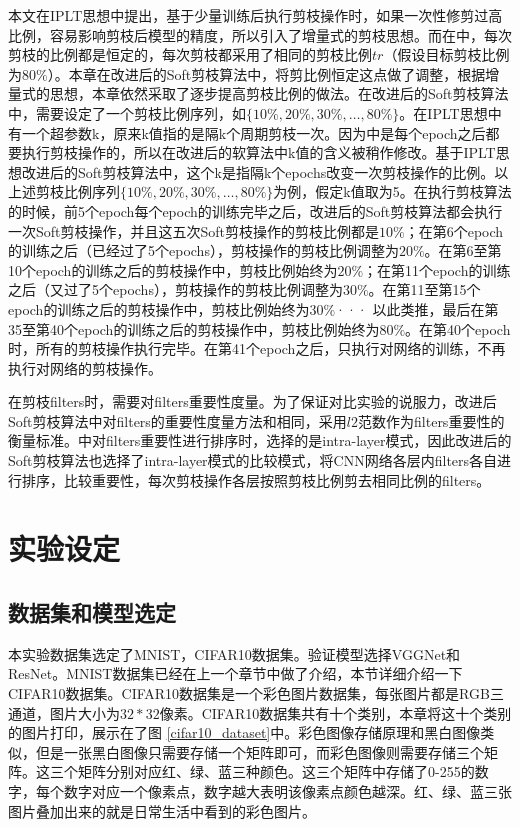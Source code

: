 \documentclass[ pdftex, oneside, master]{NJUthesis}
\begin{document}
本文在IPLT思想中提出，基于少量训练后执行剪枝操作时，如果一次性修剪过高比例，容易影响剪枝后模型的精度，所以引入了增量式的剪枝思想。而在\cite{27}中，每次剪枝的比例都是恒定的，每次剪枝都采用了相同的剪枝比例$tr$（假设目标剪枝比例为$80\%$）。本章在改进后的Soft剪枝算法中，将剪比例恒定这点做了调整，根据增量式的思想，本章依然采取了逐步提高剪枝比例的做法。在改进后的Soft剪枝算法中，需要设定了一个剪枝比例序列，如$\{10\%, 20\%, 30\%, \dots, 80\%\}$。在IPLT思想中有一个超参数k，原来k值指的是隔k个周期剪枝一次。因为\cite{27}中是每个epoch之后都要执行剪枝操作的，所以在改进后的软算法中k值的含义被稍作修改。基于IPLT思想改进后的Soft剪枝算法中，这个k是指隔k个epochs改变一次剪枝操作的比例。以上述剪枝比例序列$\{10\%, 20\%, 30\%, \dots, 80\%\}$为例，假定k值取为5。在执行剪枝算法的时候，前5个epoch每个epoch的训练完毕之后，改进后的Soft剪枝算法都会执行一次Soft剪枝操作，并且这五次Soft剪枝操作的剪枝比例都是$10\%$；在第6个epoch的训练之后（已经过了5个epochs），剪枝操作的剪枝比例调整为$20\%$。在第6至第10个epoch的训练之后的剪枝操作中，剪枝比例始终为$20\%$；在第11个epoch的训练之后（又过了5个epochs），剪枝操作的剪枝比例调整为$30\%$。在第11至第15个epoch的训练之后的剪枝操作中，剪枝比例始终为$30\%$··· 以此类推，最后在第35至第40个epoch的训练之后的剪枝操作中，剪枝比例始终为$80\%$。在第40个epoch时，所有的剪枝操作执行完毕。在第41个epoch之后，只执行对网络的训练，不再执行对网络的剪枝操作。

在剪枝filters时，需要对filters重要性度量。为了保证对比实验的说服力，改进后Soft剪枝算法中对filters的重要性度量方法和\cite{27}相同，采用$l2$范数作为filters重要性的衡量标准。\cite{27}中对filters重要性进行排序时，选择的是intra-layer模式，因此改进后的Soft剪枝算法也选择了intra-layer模式的比较模式，将CNN网络各层内filters各自进行排序，比较重要性，每次剪枝操作各层按照剪枝比例剪去相同比例的filters。

\section{实验设定}

\subsection{数据集和模型选定}

本实验数据集选定了MNIST，CIFAR10数据集。验证模型选择VGGNet和ResNet。MNIST数据集已经在上一个章节中做了介绍，本节详细介绍一下CIFAR10数据集。CIFAR10数据集是一个彩色图片数据集，每张图片都是RGB三通道，图片大小为$32*32$像素。CIFAR10数据集共有十个类别，本章将这十个类别的图片打印，展示在了图 \ref{cifar10_dataset}中。彩色图像存储原理和黑白图像类似，但是一张黑白图像只需要存储一个矩阵即可，而彩色图像则需要存储三个矩阵。这三个矩阵分别对应红、绿、蓝三种颜色。这三个矩阵中存储了0-255的数字，每个数字对应一个像素点，数字越大表明该像素点颜色越深。红、绿、蓝三张图片叠加出来的就是日常生活中看到的彩色图片。
\end{document}
